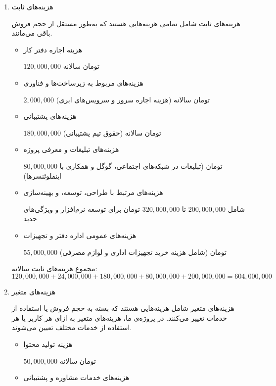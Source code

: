 \documentclass[dvipsnames, svgnames, x11names, 11pt]{article}
\begin{document}
\begin{enumerate}
\item 
هزینه‌های ثابت 

هزینه‌های ثابت شامل تمامی هزینه‌هایی هستند که به‌طور مستقل از حجم فروش باقی می‌مانند.
\begin{itemize}
\item 
هزینه اجاره دفتر کار

$120,000,000$
تومان سالانه

\item 
هزینه‌های مربوط به زیرساخت‌ها و فناوری

$2,000,000$
تومان سالانه (هزینه اجاره سرور و سرویس‌های ابری)

\item 
هزینه‌های پشتیبانی

$180,000,000$
تومان سالانه (حقوق تیم پشتیبانی)

\item 
هزینه‌های تبلیغات و معرفی پروژه 

$80,000,000$
تومان (تبلیغات در شبکه‌های اجتماعی، گوگل و همکاری با اینفلوئنسرها)

\item 
هزینه‌های مرتبط با طراحی، توسعه، و بهینه‌سازی

شامل
$200,000,000$
تا
$320,000,000$
تومان برای توسعه نرم‌افزار و ویژگی‌های جدید

\item 
هزینه‌های عمومی اداره دفتر و تجهیزات

$55,000,000$
تومان (شامل هزینه خرید تجهیزات اداری و لوازم مصرفی)
\end{itemize}
مجموع هزینه‌های ثابت سالانه:
\begin{equation*}
120,000,000 + 24,000,000 + 180,000,000 + 80,000,000 + 200,000,000 = 604,000,000
\end{equation*}

\item 
 هزینه‌های متغیر 

هزینه‌های متغیر شامل هزینه‌هایی هستند که بسته به حجم فروش یا استفاده از خدمات تغییر می‌کنند. در پروژه‌ی ما، هزینه‌های متغیر به ازای هر کاربر یا هر استفاده از خدمات مختلف تعیین می‌شوند.

\begin{itemize}
\item 
هزینه تولید محتوا

$50,000,000$
تومان سالانه

\item 
هزینه‌های خدمات مشاوره و پشتیبانی


\end{itemize}
\end{enumerate}
\end{document}
